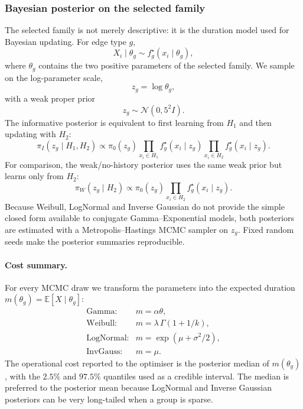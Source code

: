 \documentclass[11pt,a4paper]{article}
\begin{document}
\subsubsection{Bayesian posterior on the selected family}
The selected family is not merely descriptive: it is the duration model used for
Bayesian updating. For edge type $g$,
\[
X_i\mid\theta_g \sim f_g^\star(x_i\mid\theta_g),
\]
where $\theta_g$ contains the two positive parameters of the selected family. We
sample on the log-parameter scale,
\[
z_g=\log\theta_g,
\]
with a weak proper prior
\[
z_g\sim\mathcal N(0,5^2 I).
\]
The informative posterior is equivalent to first learning from $H_1$ and then
updating with $H_2$:
\begin{equation}
\pi_I(z_g\mid H_1,H_2)
\propto
\pi_0(z_g)
\prod_{x_i\in H_1} f_g^\star(x_i\mid z_g)
\prod_{x_i\in H_2} f_g^\star(x_i\mid z_g).
\label{eq:posterior_mcmc_inf}
\end{equation}
For comparison, the weak/no-history posterior uses the same weak prior but learns
only from $H_2$:
\begin{equation}
\pi_W(z_g\mid H_2)
\propto
\pi_0(z_g)
\prod_{x_i\in H_2} f_g^\star(x_i\mid z_g).
\label{eq:posterior_mcmc_weak}
\end{equation}
Because Weibull, LogNormal and Inverse Gaussian do not provide the simple closed
form available to conjugate Gamma--Exponential models, both posteriors are
estimated with a Metropolis--Hastings MCMC sampler on $z_g$. Fixed random seeds
make the posterior summaries reproducible.

\paragraph{Cost summary.}
For every MCMC draw we transform the parameters into the expected duration
$m(\theta_g)=\mathbb E[X\mid\theta_g]$:
\[
\begin{array}{ll}
\text{Gamma:} & m=\alpha\theta,\\
\text{Weibull:} & m=\lambda\,\Gamma(1+1/k),\\
\text{LogNormal:} & m=\exp(\mu+\sigma^2/2),\\
\text{InvGauss:} & m=\mu.
\end{array}
\]
The operational cost reported to the optimiser is the posterior median of
$m(\theta_g)$, with the $2.5\%$ and $97.5\%$ quantiles used as a credible
interval. The median is preferred to the posterior mean because LogNormal and
Inverse Gaussian posteriors can be very long-tailed when a group is sparse.
\end{document}
